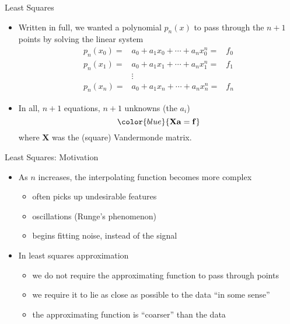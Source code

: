 \documentclass[xcolor=dvipsnames,11pt]{beamer}
\begin{document}
\begin{frame}{Least Squares}
\begin{itemize}
\item Written in full, we wanted a polynomial $p_n(x)$ to pass through the $n+1$ points by solving the linear system
\begin{eqnarray}
p_n(x_0) = & a_0 + a_1 x_0 + \cdots + a_n x_0^n = & f_0 \nonumber \\
p_n(x_1) = & a_0 + a_1 x_1 + \cdots + a_n x_1^n  = & f_1  \nonumber \\
& \vdots & \nonumber \\
p_n(x_n) = & a_0 + a_1 x_n + \cdots + a_n x_n^n  = & f_n \nonumber
\end{eqnarray}
\vspace*{-\baselineskip}%
\item In all, $n + 1$ equations, $n + 1$ unknowns (the $a_i$)
$${\color{blue}{\mathbf{X a = f}}}$$
where $\mathbf{X}$ was the (square) Vandermonde matrix.

\end{itemize}
\end{frame}


\begin{frame}{Least Squares: Motivation}
\begin{itemize}
\item As $n$ increases, the interpolating function becomes more complex


\begin{itemize}
\item often picks up undesirable features
\item oscillations (Runge's phenomenon)
\item begins fitting noise, instead of the signal
\end{itemize}


\item In least squares approximation
\begin{itemize}
\item we do not require the approximating function to pass through points
\item we require it to lie as close as possible to the data ``in some sense''
\item the approximating function is ``coarser'' than the data
\end{itemize}



\end{itemize}
\end{frame}
\end{document}
